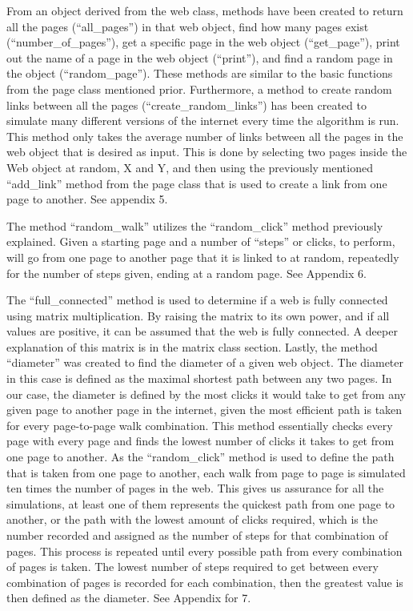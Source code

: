 \documentclass{article}
\begin{document}
From an object derived from the web class, methods have been created to return all the pages (“all\_pages”) in that web object, find how many pages exist (“number\_of\_pages”), get a specific page in the web object (“get\_page”), print out the name of a page in the web object (“print”), and find a random page in the object (“random\_page”). These methods are similar to the basic functions from the page class mentioned prior. Furthermore, a method to create random links between all the pages (“create\_random\_links”) has been created to simulate many different versions of the internet every time the algorithm is run. This method only takes the average number of links between all the pages in the web object that is desired as input. This is done by selecting two pages inside the Web object at random, X and Y, and then using the previously mentioned “add\_link” method from the page class that is used to create a link from one page to another. See appendix 5. 
\bigskip

The method “random\_walk” utilizes the “random\_click” method previously explained. Given a starting page and a number of “steps” or clicks, to perform, will go from one page to another page that it is linked to at random, repeatedly for the number of steps given, ending at a random page. See Appendix 6.
\bigskip

The “full\_connected” method is used to determine if a web is fully connected using matrix multiplication. By raising the matrix to its own power, and if all values are positive, it can be assumed that the web is fully connected. A deeper explanation of this matrix is in the matrix class section. Lastly, the method “diameter” was created to find the diameter of a given web object. The diameter in this case is defined as the maximal shortest path between any two pages. In our case, the diameter is defined by the most clicks it would take to get from any given page to another page in the internet, given the most efficient path is taken for every page-to-page walk combination. This method essentially checks every page with every page and finds the lowest number of clicks it takes to get from one page to another. As the “random\_click” method is used to define the path that is taken from one page to another, each walk from page to page is simulated ten times the number of pages in the web. This gives us assurance for all the simulations, at least one of them represents the quickest path from one page to another, or the path with the lowest amount of clicks required, which is the number recorded and assigned as the number of steps for that combination of pages. This process is repeated until every possible path from every combination of pages is taken. The lowest number of steps required to get between every combination of pages is recorded for each combination, then the greatest value is then defined as the diameter. See Appendix for 7.
\bigskip \bigskip \bigskip
\end{document}
